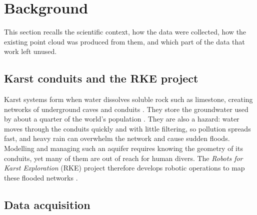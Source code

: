 \section{Background}                     %
\label{sec:background}                   %

This section recalls the scientific context,
how the data were collected, how the existing point cloud was produced from them, and which part
of the data that work left unused.

\subsection{Karst conduits and the RKE project}   %
\label{sec:bg_context}                            %

Karst systems form when water dissolves soluble rock such as limestone, creating networks of
underground caves and conduits \citep{ford2007karst}. They store the groundwater used by about a
quarter of the world's population \citep{goldscheider2020karst}. They are also a hazard: water
moves through the conduits quickly and with little filtering, so pollution spreads fast, and
heavy rain can overwhelm the network and cause sudden floods. Modelling and managing such an aquifer
requires knowing the geometry of its conduits, yet many of them are out of reach for human divers.
The \emph{Robots for Karst Exploration} (RKE) project therefore develops robotic operations to map
these flooded networks \citep{lapierre2021karst}.

\subsection{Data acquisition}            %
\label{sec:bg_acquisition}               %

